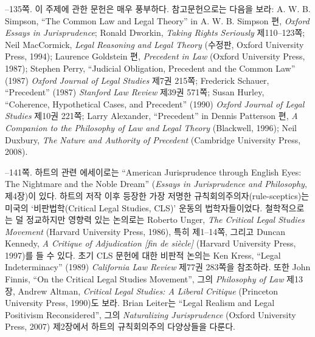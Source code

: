 {--135쪽.  이 주제에 관한 문헌은 매우 풍부하다.
참고문헌으로는 다음을 보라: A. W. B. Simpson, “The Common Law and Legal
Theory” in A. W. B. Simpson 편, \emph{Oxford Essays in Jurisprudence};
Ronald Dworkin, \emph{Taking Rights Seriously} 제110--123쪽; Neil
MacCormick, \emph{Legal Reasoning and Legal Theory} (수정판, Oxford
University Press, 1994); Laurence Goldstein 편, \emph{Precedent in Law}
(Oxford University Press, 1987); Stephen Perry, “Judicial Obligation,
Precedent and the Common Law” (1987) \emph{Oxford Journal of Legal
Studies} 제7권 215쪽; Frederick Schauer, “Precedent” (1987)
\emph{Stanford Law Review} 제39권 571쪽; Susan Hurley, “Coherence,
Hypothetical Cases, and Precedent” (1990) \emph{Oxford Journal of Legal
Studies} 제10권 221쪽; Larry Alexander, “Precedent” in Dennis
Patterson 편, \emph{A Companion to the Philosophy of Law and Legal
Theory} (Blackwell, 1996); Neil Duxbury, \emph{The Nature and Authority
of Precedent} (Cambridge University Press, 2008).

--141쪽.  하트의 관련 에세이로는 “American Jurisprudence through
English Eyes: The Nightmare and the Noble Dream” (\emph{Essays in
Jurisprudence and Philosophy}, 제4장)이 있다. 하트의 저작 이후 등장한
가장 저명한 규칙회의주의자(rule-sceptics)는 미국의 ‘비판법학(Critical
Legal Studies, CLS)’ 운동의 법학자들이었다. 철학적으로는 덜 정교하지만
영향력 있는 논의로는 Roberto Unger, \emph{The Critical Legal Studies
Movement} (Harvard University Press, 1986), 특히 제1--14쪽, 그리고
Duncan Kennedy, \emph{A Critique of Adjudication {[}fin de siècle{]}}
(Harvard University Press, 1997)를 들 수 있다. 초기 CLS 문헌에 대한
비판적 논의는 Ken Kress, “Legal Indeterminacy” (1989) \emph{California
Law Review} 제77권 283쪽을 참조하라. 또한 John Finnis, “On the Critical
Legal Studies Movement”, 그의 \emph{Philosophy of Law} 제13장, Andrew
Altman, \emph{Critical Legal Studies: A Liberal Critique} (Princeton
University Press, 1990)도 보라. Brian Leiter는 “Legal Realism and Legal
Positivism Reconsidered”, 그의 \emph{Naturalizing Jurisprudence}
(Oxford University Press, 2007) 제2장에서 하트의 규칙회의주의 다양상들을
다룬다.
}
